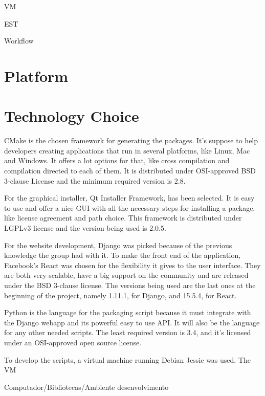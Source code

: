 VM

EST

Workflow

\section[Platform]{Platform}


\section[Technology Choice]{Technology Choice}

CMake is the chosen framework for generating the packages. It's suppose to help developers creating applications that run in several platforms, like Linux, Mac and Windows. It offers a lot options for that, like cross compilation and compilation directed to each of them. It is distributed under OSI-approved BSD 3-clause License and the minimum required version is 2.8.

For the graphical installer, Qt Installer Framework, has been selected. It is easy to use and offer a nice GUI with all the necessary steps for installing a package, like license agreement and path choice. This framework is distributed under LGPLv3 license and the version being used is 2.0.5.

For the website development, Django was picked because of the previous knowledge the group had with it. To make the front end of the application, Facebook's React was chosen for the flexibility it gives to the user interface. They are both very scalable, have a big support on the community and are released under the BSD 3-clause license. The versions being used are the last ones at the beginning of the project, namely 1.11.1, for Django, and 15.5.4, for React.

Python is the language for the packaging script because it must integrate with the Django webapp and its powerful easy to use API. It will also be the language for any other needed scripts. The least required version is 3.4, and it's licensed under an OSI-approved open source license.

To develop the scripts, a virtual machine running Debian Jessie was used. The VM

Computador/Bibliotecas/Ambiente desenvolvimento
